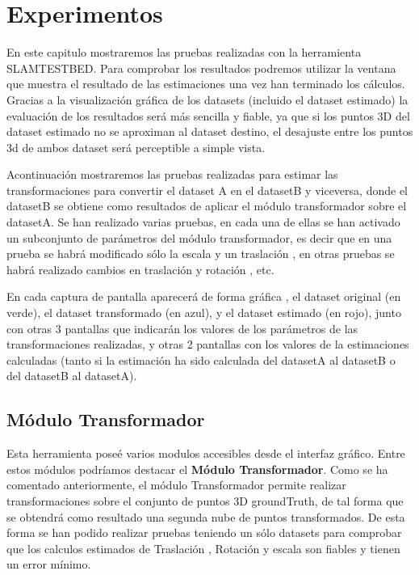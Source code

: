 \newpage
\chapter{Experimentos} \label{cap:experimentos}
En este capitulo mostraremos las pruebas realizadas con la herramienta SLAMTESTBED.
Para comprobar los resultados podremos utilizar la ventana que muestra el resultado de las estimaciones una vez han terminado los cálculos. Gracias a la visualización gráfica de los datasets (incluido el dataset estimado) la evaluación de los resultados será más sencilla y fiable, ya que si los puntos 3D del dataset estimado no se aproximan al dataset destino, el desajuste entre los puntos 3d de ambos dataset será perceptible a simple vista.


Acontinuación mostraremos las pruebas realizadas para estimar las transformaciones para convertir el dataset A en el datasetB y viceversa, donde el datasetB se obtiene como resultados de aplicar el módulo transformador sobre el datasetA.
Se han realizado varias pruebas, en cada una de ellas se han activado un subconjunto de parámetros del módulo transformador, es decir que en una prueba se habrá modificado sólo la escala y un traslación , en otras pruebas se habrá realizado cambios en traslación y rotación , etc.

En cada captura de pantalla aparecerá de forma gráfica , el dataset original (en verde), el dataset transformado (en azul), y el dataset estimado (en rojo), junto con otras 3 pantallas que indicarán los valores de los parámetros de las transformaciones realizadas, y otras 2 pantallas con los valores de la estimaciones calculadas (tanto si la estimación ha sido calculada del datasetA al datasetB o del datasetB al datasetA).

\section{Módulo Transformador}
Esta herramienta poseé varios modulos accesibles desde el interfaz gráfico. Entre estos módulos podríamos destacar el \textbf{Módulo Transformador}.
Como se ha comentado anteriormente, el módulo Transformador permite realizar transformaciones sobre el conjunto de puntos 3D groundTruth, de tal forma que se obtendrá como resultado una segunda nube de puntos transformados. De esta forma se han podido realizar pruebas teniendo un sólo datasets para comprobar que los calculos estimados de Traslación , Rotación y escala son fiables y tienen un error mínimo.

